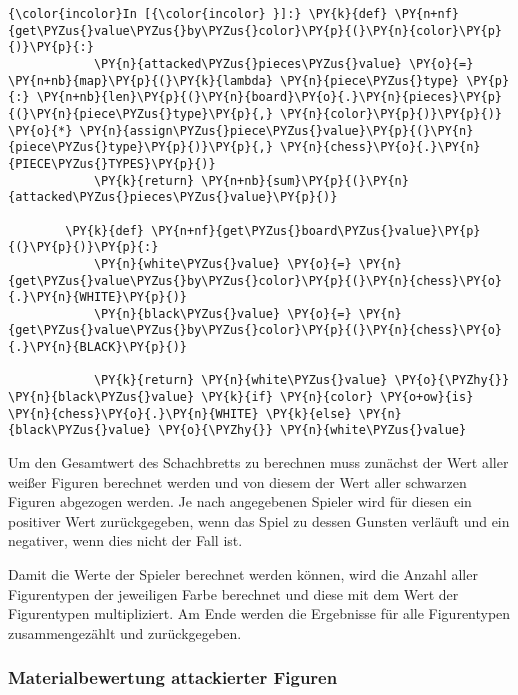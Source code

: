     \begin{Verbatim}[commandchars=\\\{\}]
{\color{incolor}In [{\color{incolor} }]:} \PY{k}{def} \PY{n+nf}{get\PYZus{}value\PYZus{}by\PYZus{}color}\PY{p}{(}\PY{n}{color}\PY{p}{)}\PY{p}{:}
            \PY{n}{attacked\PYZus{}pieces\PYZus{}value} \PY{o}{=} \PY{n+nb}{map}\PY{p}{(}\PY{k}{lambda} \PY{n}{piece\PYZus{}type} \PY{p}{:} \PY{n+nb}{len}\PY{p}{(}\PY{n}{board}\PY{o}{.}\PY{n}{pieces}\PY{p}{(}\PY{n}{piece\PYZus{}type}\PY{p}{,} \PY{n}{color}\PY{p}{)}\PY{p}{)} \PY{o}{*} \PY{n}{assign\PYZus{}piece\PYZus{}value}\PY{p}{(}\PY{n}{piece\PYZus{}type}\PY{p}{)}\PY{p}{,} \PY{n}{chess}\PY{o}{.}\PY{n}{PIECE\PYZus{}TYPES}\PY{p}{)}
            \PY{k}{return} \PY{n+nb}{sum}\PY{p}{(}\PY{n}{attacked\PYZus{}pieces\PYZus{}value}\PY{p}{)}
        
        \PY{k}{def} \PY{n+nf}{get\PYZus{}board\PYZus{}value}\PY{p}{(}\PY{p}{)}\PY{p}{:}
            \PY{n}{white\PYZus{}value} \PY{o}{=} \PY{n}{get\PYZus{}value\PYZus{}by\PYZus{}color}\PY{p}{(}\PY{n}{chess}\PY{o}{.}\PY{n}{WHITE}\PY{p}{)}
            \PY{n}{black\PYZus{}value} \PY{o}{=} \PY{n}{get\PYZus{}value\PYZus{}by\PYZus{}color}\PY{p}{(}\PY{n}{chess}\PY{o}{.}\PY{n}{BLACK}\PY{p}{)}
            
            \PY{k}{return} \PY{n}{white\PYZus{}value} \PY{o}{\PYZhy{}} \PY{n}{black\PYZus{}value} \PY{k}{if} \PY{n}{color} \PY{o+ow}{is} \PY{n}{chess}\PY{o}{.}\PY{n}{WHITE} \PY{k}{else} \PY{n}{black\PYZus{}value} \PY{o}{\PYZhy{}} \PY{n}{white\PYZus{}value}
\end{Verbatim}

    Um den Gesamtwert des Schachbretts zu berechnen muss zunächst der Wert
aller weißer Figuren berechnet werden und von diesem der Wert aller
schwarzen Figuren abgezogen werden. Je nach angegebenen Spieler wird für
diesen ein positiver Wert zurückgegeben, wenn das Spiel zu dessen
Gunsten verläuft und ein negativer, wenn dies nicht der Fall ist.

Damit die Werte der Spieler berechnet werden können, wird die Anzahl
aller Figurentypen der jeweiligen Farbe berechnet und diese mit dem Wert
der Figurentypen multipliziert. Am Ende werden die Ergebnisse für alle
Figurentypen zusammengezählt und zurückgegeben.

    \subsubsection{Materialbewertung attackierter
Figuren}\label{materialbewertung-attackierter-figuren}

